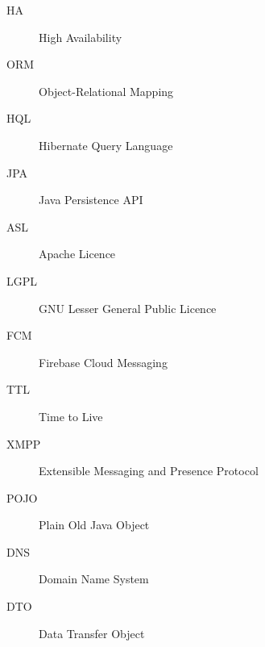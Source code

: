 \begin{description}
        \item[HA] High Availability
        \item[ORM] Object-Relational Mapping
        \item[HQL] Hibernate Query Language
        \item[JPA] Java Persistence API
        \item[ASL] Apache Licence
        \item[LGPL] GNU Lesser General Public Licence
        \item[FCM] Firebase Cloud Messaging
        \item[TTL] Time to Live
        \item[XMPP] Extensible Messaging and Presence Protocol
        \item[POJO] Plain Old Java Object
        \item[DNS] Domain Name System
        \item[DTO] Data Transfer Object
\end{description}
	